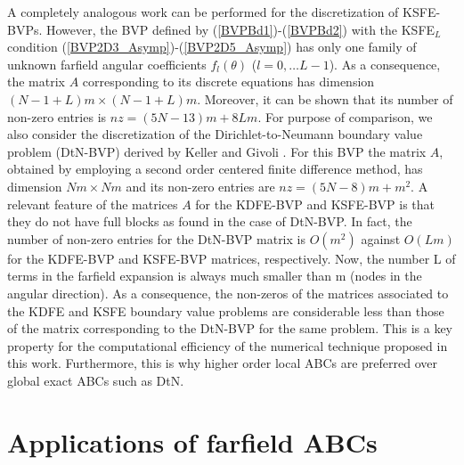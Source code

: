 \documentclass[final,3p,times,12pt]{elsarticle}
\begin{document}
A completely analogous work can be performed for the discretization of KSFE-BVPs.  However, the BVP defined by (\ref{BVPBd1})-(\ref{BVPBd2}) with the KSFE$_L$ condition (\ref{BVP2D3_Asymp})-(\ref{BVP2D5_Asymp}) has only  one family of unknown farfield angular coefficients $f_l(\theta)$ ($l=0,\dots L-1$). As a consequence, the matrix $A$ corresponding to its discrete equations has dimension $(N-1+L)m\times(N-1+L)m$. Moreover, it can be shown that its number of non-zero entries is $nz=(5N-13)m+8Lm$. For purpose of comparison, we also consider the discretization of the Dirichlet-to-Neumann  boundary value problem (DtN-BVP) derived by Keller and Givoli \cite{Keller01}.  For this BVP the matrix $A$, obtained by employing a second order centered finite difference method, has dimension $Nm\times Nm$ and its non-zero entries are $nz=(5N-8)m+m^2$.
A relevant feature of the matrices $A$ for the KDFE-BVP and KSFE-BVP is that they do not have full blocks as found in the case of DtN-BVP. In fact, the number of non-zero entries for the DtN-BVP matrix is $O(m^2)$ against $O(Lm)$ for the KDFE-BVP and KSFE-BVP matrices, respectively. Now, the number L of terms in the farfield expansion is always much smaller than m (nodes in the angular direction). As a consequence, the non-zeros of the matrices associated to the KDFE and KSFE boundary value problems are considerable less than those of the matrix corresponding to the DtN-BVP for the same problem.
This is a key property for the computational efficiency of the numerical technique proposed in this work. Furthermore, this is why higher order local ABCs are preferred over global exact ABCs such as DtN.

\section{Applications of farfield ABCs}\label{Problems}
\end{document}
